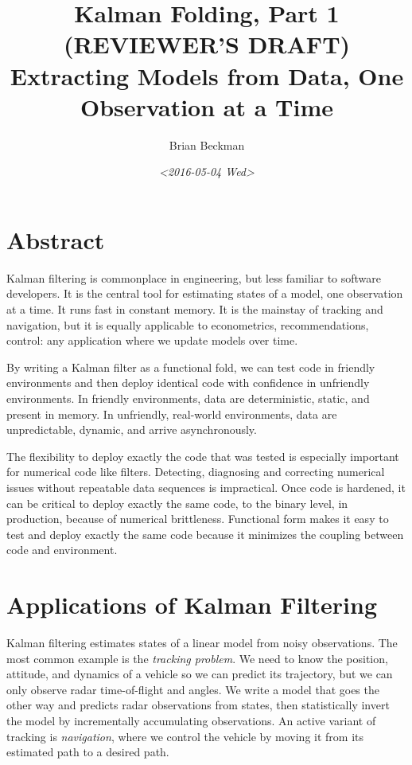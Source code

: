 \documentclass[10pt,oneside,x11names]{article}
\author{Brian Beckman}
\date{\textit{<2016-05-04 Wed>}}
\title{Kalman Folding, Part 1 (REVIEWER'S DRAFT)\\\medskip
\large Extracting Models from Data, One Observation at a Time}
\begin{document}
\maketitle
\setcounter{tocdepth}{3}
\tableofcontents


\section{Abstract}
\label{sec:orgheadline1}

Kalman filtering is commonplace in engineering, but less familiar to software
developers. It is the central tool for estimating states of a model, one
observation at a time. It runs fast in constant memory. It is the mainstay of
tracking and navigation, but it is equally applicable to econometrics,
recommendations, control: any application where we update models over time.

By writing a Kalman filter as a functional fold, we can test code in friendly
environments and then deploy identical code with confidence in unfriendly
environments. In friendly environments, data are deterministic, static, and
present in memory. In unfriendly, real-world environments,
data are unpredictable, dynamic, and arrive asynchronously.

The flexibility to deploy exactly the code that was tested is especially
important for numerical code like filters. Detecting, diagnosing and correcting
numerical issues without repeatable data sequences is impractical. Once code is
hardened, it can be critical to deploy exactly the same code, to the binary
level, in production, because of numerical brittleness. Functional form makes it
easy to test and deploy exactly the same code because it minimizes the coupling
between code and environment.

\section{Applications of Kalman Filtering}
\label{sec:orgheadline2}

Kalman filtering estimates states of a linear model from noisy observations. The
most common example is the \emph{tracking problem}. We need to know the position,
attitude, and dynamics of a vehicle so we can predict its trajectory, but we can
only observe radar time-of-flight and angles. We write a model that goes the
other way and predicts radar observations from states, then statistically invert
the model by incrementally accumulating observations. An active variant of
tracking is \emph{navigation}, where we control the vehicle by moving it from its
estimated path to a desired path.
\end{document}
